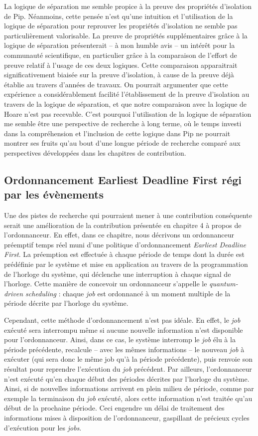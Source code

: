 		La logique de séparation me semble propice à la preuve des propriétés d'isolation de Pip. Néanmoins, cette pensée n'est qu'une intuition et l'utilisation de la logique de séparation pour reprouver les propriétés d'isolation ne semble pas particulièrement valorisable. La preuve de propriétés supplémentaires grâce à la logique de séparation présenterait -- à mon humble avis -- un intérêt pour la communauté scientifique, en particulier grâce à la comparaison de l'effort de preuve relatif à l'usage de ces deux logiques. Cette comparaison apparaitrait significativement biaisée sur la preuve d'isolation, à cause de la preuve déjà établie au travers d'années de travaux. On pourrait argumenter que cette expérience a considérablement facilité l'établissement de la preuve d'isolation au travers de la logique de séparation, et que notre comparaison avec la logique de Hoare n'est pas recevable. C'est pourquoi l'utilisation de la logique de séparation me semble être une perspective de recherche à long terme, où le temps investi dans la compréhension et l'inclusion de cette logique dans Pip ne pourrait montrer ses fruits qu'au bout d'une longue période de recherche comparé aux perspectives développées dans les chapitres de contribution.

		\subsection{Ordonnancement Earliest Deadline First régi par les évènements}

		Une des pistes de recherche qui pourraient mener à une contribution conséquente serait une amélioration de la contribution présentée en chapitre 4 à propos de l'ordonnanceur. En effet, dans ce chapitre, nous décrivons un ordonnanceur préemptif temps réel muni d'une politique d'ordonnancement \emph{Earliest Deadline First}. La préemption est effectuée à chaque période de temps dont la durée est prédéfinie par le système et mise en application au travers de la programmation de l'horloge du système, qui déclenche une interruption à chaque signal de l'horloge. Cette manière de concevoir un ordonnanceur s'appelle le \emph{quantum-driven scheduling} : chaque \emph{job} est ordonnancé à un moment multiple de la période décrite par l'horloge du système.

		Cependant, cette méthode d'ordonnancement n'est pas idéale. En effet, le \emph{job} exécuté sera interrompu même si aucune nouvelle information n'est disponible pour l'ordonnanceur. Ainsi, dans ce cas, le système interromp le \emph{job} élu à la période précédente, recalcule -- avec les mêmes informations -- le nouveau \emph{job} à exécuter (qui sera donc le même job qu'à la période précédente), puis renvoie son résultat pour reprendre l'exécution du \emph{job} précédent. Par ailleurs, l'ordonnanceur n'est exécuté qu'en chaque début des périodes décrites par l'horloge du système. Ainsi, si de nouvelles informations arrivent en plein milieu de période, comme par exemple la terminaison du \emph{job} exécuté, alors cette information n'est traitée qu'au début de la prochaine période. Ceci engendre un délai de traitement des informations mises à disposition de l'ordonnanceur, gaspillant de précieux cycles d'exécution pour les \emph{jobs}.

